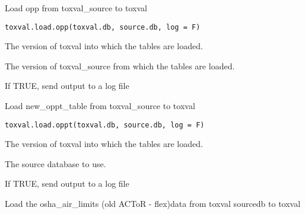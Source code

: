\documentclass[letterpaper]{book}
\begin{document}
%
\begin{Description}\relax
Load opp from toxval\_source to toxval
\end{Description}
%
\begin{Usage}
\begin{verbatim}
toxval.load.opp(toxval.db, source.db, log = F)
\end{verbatim}
\end{Usage}
%
\begin{Arguments}
\begin{ldescription}
\item[\code{toxval.db}] The version of toxval into which the tables are loaded.

\item[\code{source.db}] The version of toxval\_source from which the tables are loaded.

\item[\code{log}] If TRUE, send output to a log file
\end{ldescription}
\end{Arguments}
%
\begin{Description}\relax
Load new\_oppt\_table from toxval\_source to toxval
\end{Description}
%
\begin{Usage}
\begin{verbatim}
toxval.load.oppt(toxval.db, source.db, log = F)
\end{verbatim}
\end{Usage}
%
\begin{Arguments}
\begin{ldescription}
\item[\code{toxval.db}] The version of toxval into which the tables are loaded.

\item[\code{source.db}] The source database to use.

\item[\code{log}] If TRUE, send output to a log file
\end{ldescription}
\end{Arguments}
%
\begin{Description}\relax
Load the osha\_air\_limits (old ACToR - flex)data  from toxval sourcedb to toxval
\end{Description}
\end{document}
